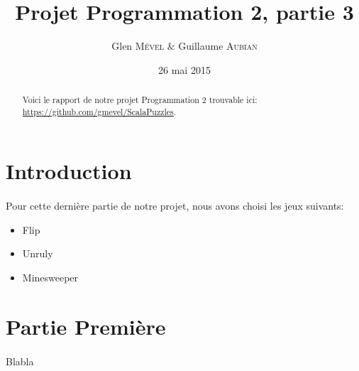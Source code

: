\documentclass[a4paper]{article}
\title{Projet Programmation 2, partie 3}
\author{Glen \textsc{Mével} \& Guillaume \textsc{Aubian}}
\date{26 mai 2015}
\begin{document}
\maketitle

	\begin{abstract}
	Voici le rapport de notre projet Programmation 2 trouvable ici: \\
	\url{https://github.com/gmevel/ScalaPuzzles}.
	\end{abstract}

\section*{Introduction}

	\paragraph{}
	Pour cette dernière partie de notre projet, nous avons choisi les jeux suivants:
	\begin{itemize}
	\item Flip
	\item Unruly
	\item Minesweeper
	\end{itemize}

\section{Partie Première}

	\paragraph{}
	Blabla
\end{document}
